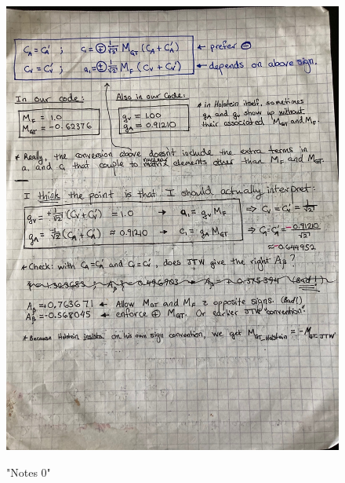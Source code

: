 \begin{figure}[htb]
	\centering
	{\includegraphics[width=.999\linewidth]
	{Figures/oldnotes_holstein_jtw/image0.jpg} }
	\caption{"Notes 0"}
	\label{fig:notes0}
\end{figure}

